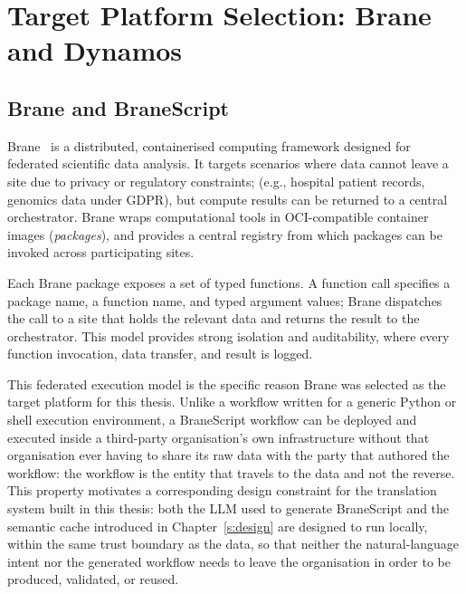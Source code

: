 \section{Target Platform Selection: Brane and Dynamos}

\subsection{Brane and BraneScript}

Brane~\cite{brane2022} is a distributed, containerised computing framework
designed for federated scientific data analysis. It targets scenarios where
data cannot leave a site due to privacy or regulatory constraints;
(e.g., hospital patient records, genomics data under GDPR), but compute results
can be returned to a central orchestrator. Brane wraps computational tools in
OCI-compatible container images (\emph{packages}), and provides a central
registry from which packages can be invoked across participating sites.

Each Brane package exposes a set of typed functions. A function call specifies
a package name, a function name, and typed argument values; Brane dispatches
the call to a site that holds the relevant data and returns the result to the
orchestrator. This model provides strong isolation and auditability, where every
function invocation, data transfer, and result is logged.

This federated execution model is the specific reason Brane was selected as
the target platform for this thesis. Unlike a workflow written for a generic
Python or shell execution environment, a BraneScript workflow can be deployed
and executed inside a third-party organisation's own infrastructure without
that organisation ever having to share its raw data with the party that
authored the workflow: the workflow is the entity that travels to the data and not the reverse. 
This property motivates a corresponding design constraint for the translation
system built in this thesis: both the LLM used to generate BraneScript and the
semantic cache introduced in Chapter~\ref{s:design} are designed to run
locally, within the same trust boundary as the data, so that neither the
natural-language intent nor the generated workflow needs to leave the
organisation in order to be produced, validated, or reused.

